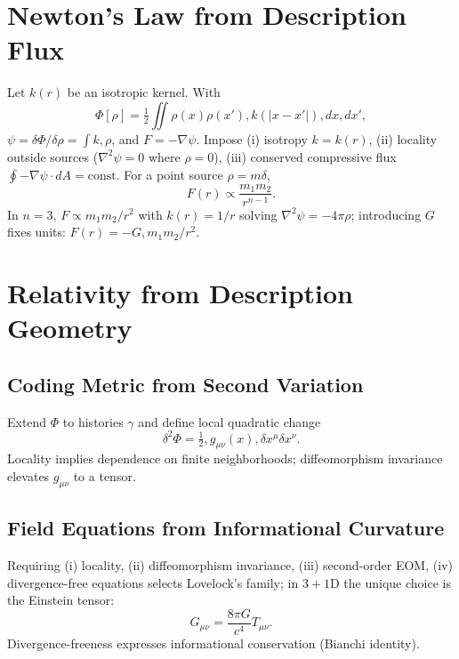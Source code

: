 \documentclass[aps,preprint,onecolumn,longbibliography,nofootinbib]{revtex4-2}
\numberwithin{equation}{section}
\begin{document}
\section{Newton's Law from Description Flux}
Let $k(r)$ be an isotropic kernel. With
\begin{equation}
\Phi[\rho]=\tfrac12\iint\rho(x)\rho(x'),k(|x-x'|),dx,dx',\label{eq:pair}
\end{equation}
$\psi=\delta\Phi/\delta\rho=\int k,\rho$, and $F=-\nabla\psi$. Impose (i) isotropy $k=k(r)$, (ii) locality outside sources ($\nabla^2\psi=0$ where $\rho=0$), (iii) conserved compressive flux $\oint-\nabla\psi\cdot dA=\text{const}$. For a point source $\rho=m\delta$,
\begin{equation}
F(r)\propto\frac{m_1m_2}{r^{n-1}}.\label{eq:dimlaw}
\end{equation}
In $n=3$, $F\propto m_1m_2/r^2$ with $k(r)=1/r$ solving $\nabla^2\psi=-4\pi\rho$; introducing $G$ fixes units: $F(r)=-G,m_1m_2/r^2$.

\section{Relativity from Description Geometry}
\subsection{Coding Metric from Second Variation}\label{sec:metric}
Extend $\Phi$ to histories $\gamma$ and define local quadratic change
\begin{equation}
\delta^2\Phi=\tfrac12,g_{\mu\nu}(x),\delta x^\mu\delta x^\nu.\label{eq:2ndvar}
\end{equation}
Locality implies dependence on finite neighborhoods; diffeomorphism invariance elevates $g_{\mu\nu}$ to a tensor.

\subsection{Field Equations from Informational Curvature}
Requiring (i) locality, (ii) diffeomorphism invariance, (iii) second-order EOM, (iv) divergence-free equations selects Lovelock’s family; in $3{+}1$D the unique choice is the Einstein tensor:
\begin{equation}
G_{\mu\nu}=\frac{8\pi G}{c^4}T_{\mu\nu}.\label{eq:einstein}
\end{equation}
Divergence-freeness expresses informational conservation (Bianchi identity).
\end{document}
